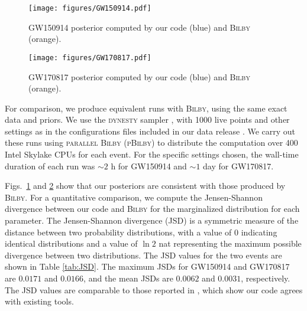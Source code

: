 \documentclass[twocolumn]{aastex631}
\begin{document}
\begin{figure}
    \texttt{[image: figures/GW150914.pdf]}
    \caption{
      GW150914 posterior computed by our code (blue) and \textsc{Bilby} (orange).
    }
    \label{fig:GW150914}
\end{figure}

\begin{figure}
\texttt{[image: figures/GW170817.pdf]}
\caption{
    GW170817 posterior computed by our code (blue) and \textsc{Bilby} (orange).
}
\label{fig:GW170817}
\end{figure}

For comparison, we produce equivalent runs with \textsc{Bilby}, using the same
exact data and priors.  We use the \textsc{dynesty} sampler
\cite{2020MNRAS.493.3132S,dynesty}, with 1000 live points and other settings as
in the configurations files included in our data release \cite{release}.  We
carry out these runs using \textsc{parallel Bilby} (\textsc{pBilby})
\cite{Smith:2019ucc} to distribute the computation over 400 Intel Skylake CPUs
for each event.  For the specific settings chosen, the wall-time duration of
each run was ${\sim}2$ h for GW150914 and ${\sim}1$ day for GW170817.


Figs.~\ref{fig:GW150914} and \ref{fig:GW170817} show that our posteriors are
consistent with those produced by \textsc{Bilby}.  For a quantitative
comparison, we compute the Jensen-Shannon divergence between our code and
\textsc{Bilby} for the marginalized distribution for each parameter. The
Jensen-Shannon divergence (JSD) is a symmetric measure of the distance between
two probability distributions, with a value of 0 indicating identical
distributions and a value of $\ln{2}$ nat representing the maximum
possible divergence between two distributions. The JSD values for the two events
are shown in Table \ref{tab:JSD}. The maximum JSDs for GW150914 and GW170817 are
$0.0171$ and $0.0166$, and the mean JSDs are $0.0062$ and $0.0031$,
respectively. The JSD values are comparable to those reported in
\cite{Romero-Shaw:2020owr}, which show our code agrees with existing tools.
\end{document}
